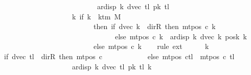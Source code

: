 \begin{isabellebody}
\ \ \ \ \ \ \ \ \ \ \ \ \ \ \ \ \ \ \ \ \ \ \ \ \ \ {\isacharminus}{\kern0pt}\ ar{\isacharunderscore}{\kern0pt}disp\ {\isacharquery}{\kern0pt}k\ {\isacharparenleft}{\kern0pt}dvec\ {\isacharquery}{\kern0pt}tl{\isacharparenright}{\kern0pt}\ {\isacharparenleft}{\kern0pt}{\isacharquery}{\kern0pt}pk\ {\isacharquery}{\kern0pt}tl{\isacharparenright}{\kern0pt}{\isacharparenright}{\kern0pt}{\isacharparenright}{\kern0pt}\isanewline
\ \ \ \ \ \ \ \ \ \ \ \ \ \ \ \ \ \ \ {\isacharequal}{\kern0pt}\ {\isacharparenleft}{\kern0pt}{\isasymlambda}k{\isachardot}{\kern0pt}\ if\ k\ {\isacharless}{\kern0pt}\ k{\isacharunderscore}{\kern0pt}tm\ M\isanewline
\ \ \ \ \ \ \ \ \ \ \ \ \ \ \ \ \ \ \ \ \ \ \ \ \ \ then\ {\isacharparenleft}{\kern0pt}if\ dvec\ k\ {\isacharequal}{\kern0pt}\ dir{\isachardot}{\kern0pt}R\ then\ mt{\isacharunderscore}{\kern0pt}pos\ c{}\ k\isanewline
\ \ \ \ \ \ \ \ \ \ \ \ \ \ \ \ \ \ \ \ \ \ \ \ \ \ \ \ \ \ \ \ else\ mt{\isacharunderscore}{\kern0pt}pos\ c{}\ k\ {\isacharminus}{\kern0pt}\ ar{\isacharunderscore}{\kern0pt}disp\ {\isacharquery}{\kern0pt}k\ {\isacharparenleft}{\kern0pt}dvec\ k{\isacharparenright}{\kern0pt}\ {\isacharparenleft}{\kern0pt}posk{}\ k{\isacharparenright}{\kern0pt}{\isacharparenright}{\kern0pt}\isanewline
\ \ \ \ \ \ \ \ \ \ \ \ \ \ \ \ \ \ \ \ \ \ \ \ \ \ else\ mt{\isacharunderscore}{\kern0pt}pos\ c{}\ k{\isacharparenright}{\kern0pt}{\isachardoublequoteclose}\isanewline
\ \ \isamarkupfalse%
\ {\isacharparenleft}{\kern0pt}rule\ ext{\isacharparenright}{\kern0pt}\isanewline
\ \ \ \ \isamarkupfalse%
\ k\isanewline
\ \ \ \ \isamarkupfalse%
\ {\isachardoublequoteopen}{\isacharparenleft}{\kern0pt}if\ dvec\ {\isacharquery}{\kern0pt}tl\ {\isacharequal}{\kern0pt}\ dir{\isachardot}{\kern0pt}R\ then\ mt{\isacharunderscore}{\kern0pt}pos\ c{}\isanewline
\ \ \ \ \ \ \ \ \ \ \ \ else\ {\isacharparenleft}{\kern0pt}mt{\isacharunderscore}{\kern0pt}pos\ c{}{\isacharparenright}{\kern0pt}{\isacharparenleft}{\kern0pt}{\isacharquery}{\kern0pt}tl\ {\isacharcolon}{\kern0pt}{\isacharequal}{\kern0pt}\ mt{\isacharunderscore}{\kern0pt}pos\ c{}\ {\isacharquery}{\kern0pt}tl\isanewline
\ \ \ \ \ \ \ \ \ \ \ \ \ \ \ \ \ \ \ {\isacharminus}{\kern0pt}\ ar{\isacharunderscore}{\kern0pt}disp\ {\isacharquery}{\kern0pt}k\ {\isacharparenleft}{\kern0pt}dvec\ {\isacharquery}{\kern0pt}tl{\isacharparenright}{\kern0pt}\ {\isacharparenleft}{\kern0pt}{\isacharquery}{\kern0pt}pk\ {\isacharquery}{\kern0pt}tl{\isacharparenright}{\kern0pt}{\isacharparenright}{\kern0pt}{\isacharparenright}{\kern0pt}\ k\isanewline

\end{isabellebody}
